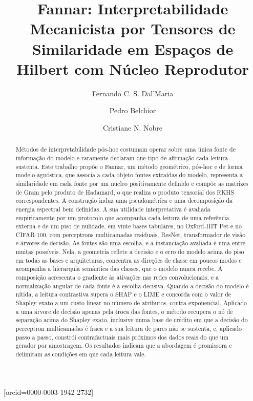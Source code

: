 \documentclass[a4paper,fleqn]{cas-sc}
\theoremstyle{plain}
\theoremstyle{definition}
\theoremstyle{remark}
\begin{document}
\let\WriteBookmarks\relax
\def\floatpagepagefraction{1}
\def\textpagefraction{.001}


\title[mode=title]{Fannar: Interpretabilidade Mecanicista por Tensores de Similaridade em Espaços de Hilbert com Núcleo Reprodutor}

\author[1]{Fernando C. S. Dal'Maria}[orcid=0000-0003-1942-2732]
\cormark[1]

\author[1]{Pedro Belchior}

\author[1]{Cristiane N. Nobre}


\begin{abstract}
Métodos de interpretabilidade pós-hoc costumam operar sobre uma única fonte de informação do modelo e raramente declaram que tipo de afirmação cada leitura sustenta. Este trabalho propõe o Fannar, um método geométrico, pós-hoc e de forma modelo-agnóstica, que associa a cada objeto fontes extraídas do modelo, representa a similaridade em cada fonte por um núcleo positivamente definido e compõe as matrizes de Gram pelo produto de Hadamard, o que realiza o produto tensorial dos RKHS correspondentes. A construção induz uma pseudométrica e uma decomposição da energia espectral bem definidas. A sua utilidade interpretativa é avaliada empiricamente por um protocolo que acompanha cada leitura de uma referência externa e de um piso de nulidade, em vinte bases tabulares, no Oxford-IIIT Pet e no CIFAR-100, com perceptrons multicamadas residuais, ResNet, transformador de visão e árvores de decisão. As fontes são uma escolha, e a instanciação avaliada é uma entre muitas possíveis. Nela, a geometria reflete a decisão e o erro do modelo acima do piso em todas as bases e arquiteturas, concentra as direções de classe em poucos modos e acompanha a hierarquia semântica das classes, que o modelo nunca recebe. A composição acrescenta o gradiente às ativações nas redes convolucionais, e a normalização angular de cada fonte é a escolha decisiva. Quando a decisão do modelo é nítida, a leitura contrastiva supera o SHAP e o LIME e concorda com o valor de Shapley exato a um custo linear no número de atributos, contra exponencial. Aplicado a uma árvore de decisão apenas pela troca das fontes, o método recupera o nó de separação acima do Shapley exato, inclusive numa base de crédito em que a decisão do perceptron multicamadas é fraca e a sua leitura de pares não se sustenta, e, aplicado passo a passo, constrói contrafactuais mais próximos dos dados reais do que um gerador por amostragem. Os resultados indicam que a abordagem é promissora e delimitam as condições em que cada leitura vale.
\end{abstract}
\end{document}
